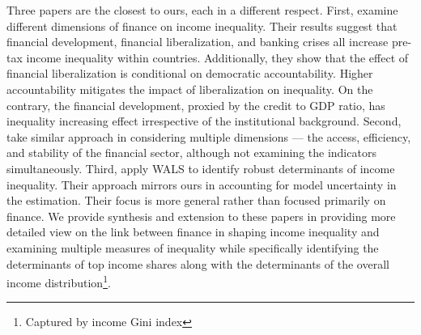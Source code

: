 \begin{refsection}
Three papers are the closest to ours, each in a different respect. First, \textcite{de2017finance} examine different dimensions of finance on income inequality. Their results suggest that financial development, financial liberalization, and banking crises all increase pre-tax income inequality within countries. Additionally, they show that the effect of financial liberalization is conditional on democratic accountability. Higher accountability mitigates the impact of liberalization on inequality. On the contrary, the financial development, proxied by the credit to GDP ratio, has inequality increasing effect irrespective of the institutional background. Second, \textcite{naceurzhang2016} take similar approach in considering multiple dimensions --- the access, efficiency, and stability of the financial sector, although not examining the indicators simultaneously.  Third, \textcite{furceri2019robust} apply \ac{WALS} to identify robust determinants of income inequality. Their approach mirrors ours in accounting for model uncertainty in the estimation. Their focus is more general rather than focused primarily on finance. We provide synthesis and extension to these papers in providing more detailed view on the link between finance in shaping income inequality and examining multiple measures of inequality while specifically identifying the determinants of top income shares along with the determinants of the overall income distribution\footnote{Captured by income Gini index}.




\end{refsection}
